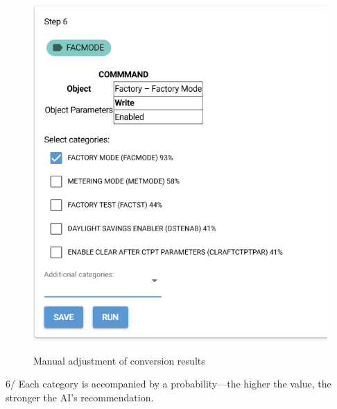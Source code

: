 \begin{figure}[H]
    \begin{center}
        \includegraphics[width=.95\linewidth]{res/ai4test-manual.png}\\
        \caption{Manual adjustment of conversion results }\label{ai4test-manual}
    \end{center}
\end{figure}

6/  Each category is accompanied by a probability—the higher the value, the stronger the AI’s recommendation.

